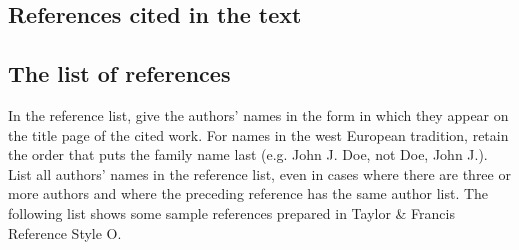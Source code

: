 \documentclass[]{interact}
\theoremstyle{plain}%
\theoremstyle{definition}
\theoremstyle{remark}
\begin{document}
\subsection{References cited in the text}




\subsection{The list of references}

In the reference list, give the authors' names in the form in which they appear on the title page of the cited work. For names in the west European tradition, retain the order that puts the family name last (e.g. John J. Doe, not Doe, John J.). List all authors' names in the reference list, even in cases where there are three or more authors and where the preceding reference has the same author list. The following list shows some sample references prepared in Taylor \& Francis Reference Style O.

\begin{thebibliography}{99}

\end{thebibliography}
\bigskip
\end{document}
